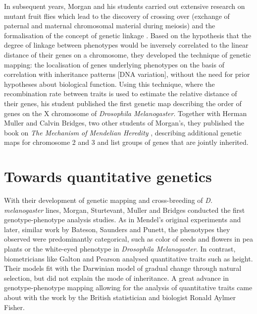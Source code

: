In subsequent years, Morgan and his students carried out extensive research on mutant fruit flies which lead to the discovery of crossing over (exchange of paternal and maternal chromosomal material during meiosis) and the formalisation of the concept of genetic linkage \citep{Morgan1911b}. Based on the hypothesis that the degree of linkage between phenotypes would be inversely correlated to the linear distance of their genes on a chromosome, they developed the technique of genetic mapping: the localisation of genes underlying phenotypes on the basis of correlation with inheritance patterns [DNA variation], without the need for prior hypotheses about biological function. Using this technique, where the recombination rate between traits is used to estimate the relative distance of their genes, his student \citet{Sturtevant1913} published the first genetic map describing the order of genes on the X chromosome of \textit{Drosophila Melanogaster}. Together with Herman Muller and Calvin Bridges, two other students of Morgan's, they published the book on \textit{The Mechanism of Mendelian Heredity} \parencite*{Morgan1915}, describing additional genetic maps for chromosome 2 and 3 and list groups of genes that are jointly inherited. 

\section{Towards quantitative genetics}
With their development of genetic mapping and cross-breeding of \textit{D. melanogaster} lines, Morgan, Sturtevant, Muller and Bridges conducted the first genotype-phenotype analysis studies. As in Mendel's original experiments and later, similar work by Bateson, Saunders and Punett, the phenotypes they observed were predominantly categorical, such as color of seeds and flowers in pea plants or the white-eyed phenotype in \textit{Drosophila Melanogaster}. In contrast, biometricians like Galton and Pearson analysed quantitative traits such as height. Their models fit with the Darwinian model of gradual change through natural selection, but did not explain the mode of inheritance.  A great advance in genotype-phenotype mapping allowing for the analysis of quantitative traits came about with the work by the British statistician and biologist Ronald Aylmer Fisher. 

